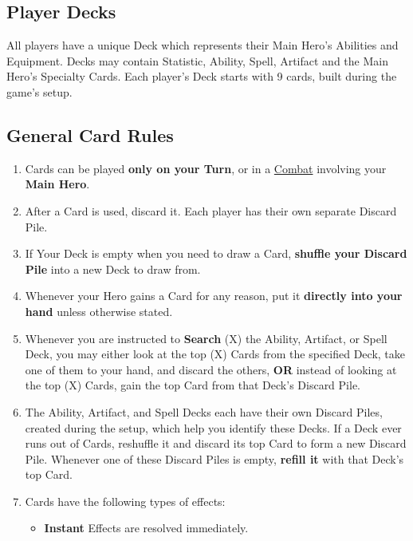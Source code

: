 
\begin{multicols*}{2}

\subsection*{\hypertarget{Playerdecks}{Player Decks}}
All players have a unique Deck which represents their Main Hero's Abilities and Equipment.
Decks may contain Statistic, Ability, Spell, Artifact and the Main Hero's Specialty Cards.
Each player's Deck starts with 9 cards, built during the game's setup.

\subsection*{General Card Rules}
\begin{enumerate}
  \item Cards can be played \textbf{only on your Turn}, or in a \hyperlink{Combat}{Combat} involving your \textbf{Main Hero}.
  \item After a Card is used, discard it.
    Each player has their own separate Discard Pile.
  \item If Your Deck is empty when you need to draw a Card, \textbf{shuffle your Discard Pile} into a new Deck to draw from.
  \item Whenever your Hero gains a Card for any reason, put it \textbf{directly into your hand} unless otherwise stated.
  \item Whenever you are instructed to \textbf{Search} (X) the Ability, Artifact, or Spell Deck, you may either look at the top (X) Cards from the specified Deck, take one of them to your hand, and discard the others, \textbf{OR} instead of looking at the top (X) Cards, gain the top Card from that Deck's Discard Pile.
  \item The Ability, Artifact, and Spell Decks each have their own Discard Piles, created during the setup, which help you identify these Decks.
    If a Deck ever runs out of Cards, reshuffle it and discard its top Card to form a new Discard Pile.
    Whenever one of these Discard Piles is empty, \textbf{refill it} with that Deck's top Card.
  \item Cards have the following \hypertarget{Card Effects}{types of effects}:
  \begin{itemize}
    \item \textbf{Instant}  Effects are resolved immediately.

\end{itemize}
\end{enumerate}
\end{multicols*}
